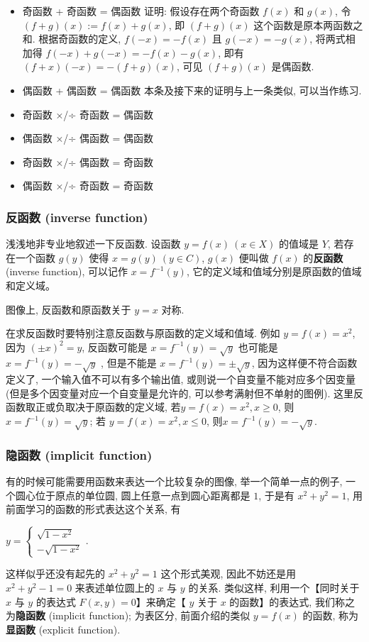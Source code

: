 \begin{itemize}
\tightlist
\item
  奇函数 + 奇函数 = 偶函数 证明: 假设存在两个奇函数 \(f(x)\) 和
  \(g(x)\), 令 \((f+g)(x) := f(x) + g(x)\), 即 \((f+g)(x)\)
  这个函数是原本两函数之和. 根据奇函数的定义, \(f(-x)=-f(x)\) 且
  \(g(-x)=-g(x)\), 将两式相加得 \(f(-x)+g(-x)=-f(x)-g(x)\), 即有
  \((f+x)(-x)=-(f+g)(x)\), 可见 \((f+g)(x)\) 是偶函数.
\item
  偶函数 + 偶函数 = 偶函数 本条及接下来的证明与上一条类似, 可以当作练习.
\item
  奇函数 ×/÷ 奇函数 = 偶函数
\item
  偶函数 ×/÷ 偶函数 = 偶函数
\item
  奇函数 ×/÷ 偶函数 = 奇函数
\item
  偶函数 ×/÷ 奇函数 = 奇函数
\end{itemize}

\hypertarget{ux53cdux51fdux6570-inverse-function}{%
\subsubsection{反函数 (inverse
function)}\label{ux53cdux51fdux6570-inverse-function}}

浅浅地非专业地叙述一下反函数. 设函数 \(y=f(x)\ (x\in X)\) 的值域是
\(Y\), 若存在一个函数 \(g(y)\) 使得 \(x= g(y)\ (y\in C)\), \(g(x)\)
便叫做 \(f(x)\) 的\textbf{反函数} (inverse function), 可以记作
\(x=f^{-1}(y)\), 它的定义域和值域分别是原函数的值域和定义域。

图像上, 反函数和原函数关于 \(y=x\) 对称.

在求反函数时要特别注意反函数与原函数的定义域和值域. 例如 \(y=f(x)=x^2\),
因为 \((\pm x)^2=y\), 反函数可能是 \(x=f^{-1}(y)=\sqrt{y}\) 也可能是
\(x=f^{-1}(y)=-\sqrt{y}\) , 但是不能是 \(x=f^{-1}(y)=\pm\sqrt{y}\),
因为这样便不符合函数定义了, 一个输入值不可以有多个输出值,
或则说一个自变量不能对应多个因变量
(但是多个因变量对应一个自变量是允许的, 可以参考满射但不单射的图例).
这里反函数取正或负取决于原函数的定义域, 若\(y=f(x)=x^2, x\ge 0\),
则\(x=f^{-1}(y)=\sqrt{y}\); 若 \(y=f(x)=x^2, x\le 0\),
则\(x=f^{-1}(y)=-\sqrt{y}\).

\hypertarget{ux9690ux51fdux6570-implicit-function}{%
\subsubsection{隐函数 (implicit
function)}\label{ux9690ux51fdux6570-implicit-function}}

有的时候可能需要用函数来表达一个比较复杂的图像, 举一个简单一点的例子,
一个圆心位于原点的单位圆, 圆上任意一点到圆心距离都是 \(1\), 于是有
\(x^2+y^2=1\), 用前面学习的函数的形式表达这个关系, 有

\(y=\begin{cases}\sqrt{1-x^2}\\-\sqrt{1-x^2}\end{cases}.\)

这样似乎还没有起先的 \(x^2+y^2=1\) 这个形式美观, 因此不妨还是用
\(x^2+y^2-1=0\) 来表述单位圆上的 \(x\) 与 \(y\) 的关系. 类似这样,
利用一个【同时关于 \(x\) 与 \(y\) 的表达式 \(F(x,y)=0\)】来确定【 \(y\)
关于 \(x\) 的函数】的表达式, 我们称之为\textbf{隐函数} (implicit
function); 为表区分, 前面介绍的类似 \(y=f(x)\) 的函数,
称为\textbf{显函数} (explicit function).
